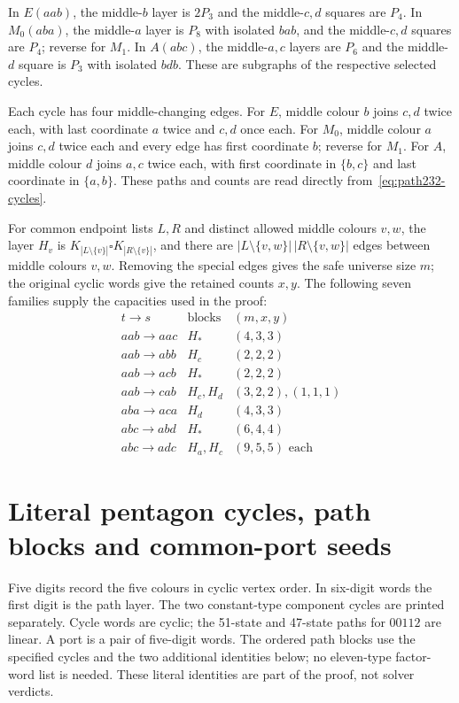 \documentclass[11pt]{article}
\numberwithin{equation}{section}
\numberwithin{table}{section}
\begin{document}
In $E(aab)$, the middle-$b$ layer is $2P_3$ and the middle-$c,d$
squares are $P_4$. In $M_0(aba)$, the middle-$a$ layer is $P_8$
with isolated $bab$, and the middle-$c,d$ squares are $P_4$;
reverse for $M_1$. In $A(abc)$, the middle-$a,c$ layers are $P_6$
and the middle-$d$ square is $P_3$ with isolated $bdb$.
These are subgraphs of the respective selected cycles.

Each cycle has four middle-changing edges. For $E$, middle colour $b$
joins $c,d$ twice each, with last coordinate $a$ twice and $c,d$
once each. For $M_0$, middle colour $a$ joins $c,d$ twice each and
every edge has first coordinate $b$; reverse for $M_1$. For $A$,
middle colour $d$ joins $a,c$ twice each, with first coordinate in
$\{b,c\}$ and last coordinate in $\{a,b\}$. These paths and counts
are read directly from~\eqref{eq:path232-cycles}.

For common endpoint lists $L,R$ and distinct allowed middle colours $v,w$,
the layer $H_v$ is
$K_{|L\setminus\{v\}|}\square K_{|R\setminus\{v\}|}$, and there are
$|L\setminus\{v,w\}|\,|R\setminus\{v,w\}|$ edges between middle
colours $v,w$. Removing the special edges gives the safe universe
size $m$; the original cyclic words give the retained counts $x,y$.
The following seven families supply the capacities used in the proof:
\[
\begin{array}{c|c|c}
t\to s&\text{blocks}&(m,x,y)\\\hline
aab\to aac&H_*&(4,3,3)\\
aab\to abb&H_c&(2,2,2)\\
aab\to acb&H_*&(2,2,2)\\
aab\to cab&H_c,H_d&(3,2,2),(1,1,1)\\
aba\to aca&H_d&(4,3,3)\\
abc\to abd&H_*&(6,4,4)\\
abc\to adc&H_a,H_c&(9,5,5)\text{ each}
\end{array}
\]
\clearpage
\section{Literal pentagon cycles, path blocks and common-port seeds}
\label{app:pentagon-factor-words}
Five digits record the five colours in cyclic vertex order. In six-digit
words the first digit is the path layer. The two constant-type component
cycles are printed separately. Cycle words are cyclic; the
51-state and 47-state paths for $00112$ are linear.
A port is a pair of five-digit words.
The ordered path blocks use the specified cycles and the two
additional identities below; no eleven-type factor-word list is needed.
These literal identities are part of the proof, not solver verdicts.
\end{document}
